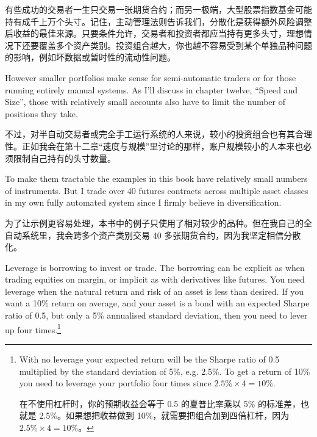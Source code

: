 \begin{chineseblock}有些成功的交易者一生只交易一张期货合约；而另一极端，大型股票指数基金可能持有成千上万个头寸。记住，主动管理法则告诉我们，分散化是获得额外风险调整后收益的最佳来源。只要条件允许，交易者和投资者都应当持有更多头寸，理想情况下还要覆盖多个资产类别。投资组合越大，你也越不容易受到某个单独品种问题的影响，例如坏数据或暂时性的流动性问题。\end{chineseblock}

\bipairgap

\begin{englishblock} However smaller portfolios make sense for semi-automatic traders or for those running entirely manual systems. As I'll discuss in chapter twelve, ``Speed and Size'', those with relatively small accounts also have to limit the number of positions they take. \end{englishblock}

\begin{chineseblock}不过，对半自动交易者或完全手工运行系统的人来说，较小的投资组合也有其合理性。正如我会在第十二章“速度与规模”里讨论的那样，账户规模较小的人本来也必须限制自己持有的头寸数量。\end{chineseblock}

\bipairgap

\begin{englishblock} To make them tractable the examples in this book have relatively small numbers of instruments. But I trade over 40 futures contracts across multiple asset classes in my own fully automated system since I firmly believe in diversification. \end{englishblock}

\begin{chineseblock}为了让示例更容易处理，本书中的例子只使用了相对较少的品种。但在我自己的全自动系统里，我会跨多个资产类别交易 40 多张期货合约，因为我坚定相信分散化。\end{chineseblock}


\begin{englishblock} Leverage is borrowing to invest or trade. The borrowing can be explicit as when trading equities on margin, or implicit as with derivatives like futures. You need leverage when the natural return and risk of an asset is less than desired. If you want a 10\% return on average, and your asset is a bond with an expected Sharpe ratio of 0.5, but only a 5\% annualised standard deviation, then you need to lever up four times.\footnote{With no leverage your expected return will be the Sharpe ratio of 0.5 multiplied by the standard deviation of 5\%, e.g. 2.5\%. To get a return of 10\% you need to leverage your portfolio four times since $2.5\% \times 4 = 10\%$. \par 在不使用杠杆时，你的预期收益会等于 0.5 的夏普比率乘以 5\% 的标准差，也就是 2.5\%。如果想把收益做到 10\%，就需要把组合加到四倍杠杆，因为 $2.5\% \times 4 = 10\%$。}\end{englishblock}


